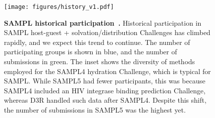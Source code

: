 \documentclass[11pt]{article}
\begin{document}
\begin{figure}
\vspace{-0.2in}
\begin{centering}
\texttt{[image: figures/history\_v1.pdf]}

\end{centering}
\footnotesize
\caption{\label{figure:sampl_history}  
\textbf{SAMPL historical participation~\cite{mobley_blind_2014-1}.} 
Historical participation in SAMPL host-guest + solvation/distribution Challenges has climbed rapidly, and we expect this trend to continue. The number of participating groups is shown in blue, and the number of submissions in green. The inset shows the diversity of methods employed for the SAMPL4 hydration Challenge, which is typical for SAMPL. 
While SAMPL5 had fewer participants, this was because SAMPL4 included an HIV integrase binding prediction Challenge, whereas D3R handled such data after SAMPL4.
Despite this shift, the number of submissions in SAMPL5 was the highest yet.
}
\end{figure}
\end{document}
